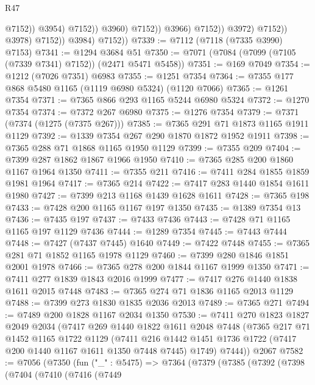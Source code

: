 \begin{lexlean}{R47}
\begin{coremodule}
                                            @7152))
                                        @3954)
                                      @7152))
                                  @3960)
                                @7152))
                            @3966)
                          @7152))
                      @3972)
                    @7152))
                @3978)
              @7152))
          @3984)
        @7152))
@7339 := @7112 (@7118 (@7335 @3990) @7153)
@7341 := @1294 @3684 @51
@7350 := @7071 (@7084 (@7099 (@7105 (@7339 @7341) @7152)) (@2471 @5471 @5458))
@7351 := @169 @7049
@7354 := @1212 (@7026 @7351) @6983
@7355 := @1251 @7354
@7364 := @7355 @177 @868 @5480 @1165 (@1119 @6980 @5324) (@1120 @7066)
@7365 := @1261 @7354
@7371 := @7365 @866 @293 @1165 @5244 @6980 @5324
@7372 := @1270 @7354
@7374 := @7372 @267 @6980
@7375 := @1276 @7354
@7379 := @7371 (@7374 (@1275 (@7375 @267)))
@7385 := @7365 @291 @71 @1873 @1165 @1911 @1129
@7392 := @1339 @7354 @267 @290 @1870 @1872 @1952 @1911
@7398 := @7365 @288 @71 @1868 @1165 @1950 @1129
@7399 := @7355 @209
@7404 := @7399 @287 @1862 @1867 @1966 @1950
@7410 := @7365 @285 @200 @1860 @1167 @1964 @1350
@7411 := @7355 @211
@7416 := @7411 @284 @1855 @1859 @1981 @1964
@7417 := @7365 @214
@7422 := @7417 @283 @1440 @1854 @1611 @1980
@7427 := @7399 @213 @1168 @1439 @1628 @1611
@7428 := @7365 @198
@7433 := @7428 @200 @1165 @1167 @197 @1350
@7435 := @1389 @7354 @13
@7436 := @7435 @197
@7437 := @7433 @7436
@7443 := @7428 @71 @1165 @1165 @197 @1129 @7436
@7444 := @1289 @7354
@7445 := @7443 @7444
@7448 := @7427 (@7437 @7445) @1640
@7449 := @7422 @7448
@7455 := @7365 @281 @71 @1852 @1165 @1978 @1129
@7460 := @7399 @280 @1846 @1851 @2001 @1978
@7466 := @7365 @278 @200 @1844 @1167 @1999 @1350
@7471 := @7411 @277 @1839 @1843 @2016 @1999
@7477 := @7417 @276 @1440 @1838 @1611 @2015 @7448
@7483 := @7365 @274 @71 @1836 @1165 @2013 @1129
@7488 := @7399 @273 @1830 @1835 @2036 @2013
@7489 := @7365 @271
@7494 := @7489 @200 @1828 @1167 @2034 @1350
@7530 := @7411
    @270
    @1823
    @1827
    @2049
    @2034
    (@7417
      @269
      @1440
      @1822
      @1611
      @2048
      @7448
      (@7365
        @217
        @71
        @1452
        @1165
        @1722
        @1129
        (@7411 @216 @1442 @1451 @1736 @1722 (@7417 @200 @1440 @1167 @1611 @1350 @7448 @7445) @1749)
        @7444))
    @2067
@7582 := @7056
    (@7350
      (fun ("_" : @5475) =>
      @7364
        (@7379
          (@7385
            (@7392
              (@7398
                (@7404
                  (@7410
                    (@7416
                      (@7449

\end{coremodule}
\end{lexlean}
